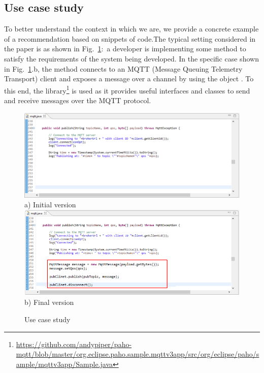 \subsection{Use case study}
To better understand the context in which we are, we provide a concrete example of a recommendation based on snippets of code.The typical setting considered in the paper is as shown in Fig.~\ref{fig:codeExample}:~a developer is implementing some method to 
satisfy the requirements of the system being developed. In the specific case 
shown in Fig.~\ref{fig:codeExample}.b, the  method connects to an MQTT (Message Queuing Telemetry Transport) client and exposes a message over a channel by using the object 
. To this end, the  
library\footnote{\url{https://github.com/andypiper/paho-mqtt/blob/master/org.eclipse.paho.sample.mqttv3app/src/org/eclipse/paho/sample/mqttv3app/Sample.java}}
is used as it provides useful interfaces and classes to send and receive messages over the MQTT protocol.

\begin{figure}[h!]
	\centering
	\includegraphics[width=\columnwidth]{figs/API-example} \\
	\scriptsize{a) Initial version} \\
	\vspace{.2cm}\includegraphics[width=\columnwidth]{figs/API-example-final} \\
	\scriptsize{b) Final version}\\
	\vspace{-.2cm}
	\caption{Use case study}
	\label{fig:codeExample}
\end{figure}

